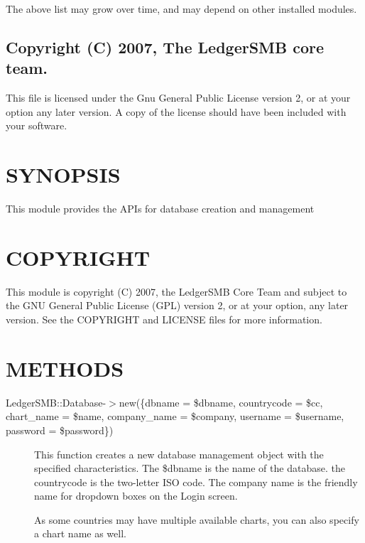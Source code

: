 \begin{description}
\begin{description}
\begin{description}
\begin{description}
\begin{description}
\begin{description}
\begin{description}
The above list may grow over time, and may depend on other installed modules.

\end{description}
\subsection*{Copyright (C) 2007, The LedgerSMB core team.\label{LedgerSMB::Contact_Copyright_C_2007_The_LedgerSMB_core_team_}}


This file is licensed under the Gnu General Public License version 2, or at your
option any later version.  A copy of the license should have been included with
your software.

\section{SYNOPSIS\label{SYNOPSIS}}


This module provides the APIs for database creation and management

\section{COPYRIGHT\label{COPYRIGHT}}


This module is copyright (C) 2007, the LedgerSMB Core Team and subject to 
the GNU General Public License (GPL) version 2, or at your option, any later
version.  See the COPYRIGHT and LICENSE files for more information.

\section{METHODS\label{METHODS}}
\begin{description}

\item[{LedgerSMB::Database-$>$new(\{dbname = \$dbname, countrycode = \$cc, chart\_name = \$name, company\_name = \$company, username = \$username, password = \$password\})}] \mbox{}

This function creates a new database management object with the specified
characteristics.  The \$dbname is the name of the database. the countrycode
is the two-letter ISO code.  The company name is the friendly name for 
dropdown boxes on the Login screen.



As some countries may have multiple available charts, you can also specify
a chart name as well.




\end{description}
\end{description}
\end{description}
\end{description}
\end{description}
\end{description}
\end{description}
